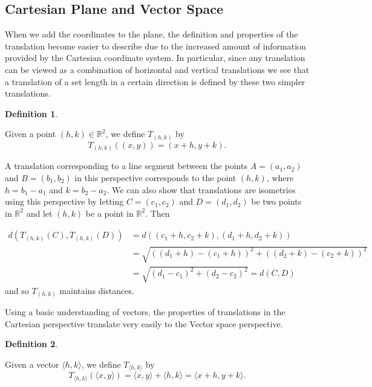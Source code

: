 \documentclass[
]{book}
\theoremstyle{definition}
\newtheorem{definition}{Definition}[chapter]
\theoremstyle{definition}
\theoremstyle{definition}
\theoremstyle{definition}
\theoremstyle{remark}
\begin{document}
\hypertarget{cartesian-plane-and-vector-space}{%
\subsection{Cartesian Plane and Vector Space}\label{cartesian-plane-and-vector-space}}

When we add the coordinates to the plane, the definition and properties of the translation become easier to describe due to the increased amount of information provided by the Cartesian coordinate system. In particular, since any translation can be viewed as a combination of horizontal and vertical translations we see that a translation of a set length in a certain direction is defined by these two simpler translations.

\begin{definition}
\protect\hypertarget{def:unlabeled-div-258}{}\label{def:unlabeled-div-258}

Given a point \((h,k)\in \mathbb{R}^2\), we define \(T_{(h,k)}\) by \[T_{(h,k)} \left( (x,y)\right) = (x+h,y+k).\]

\end{definition}

A translation corresponding to a line segment between the points \(A=(a_1,a_2)\) and \(B=(b_1,b_2)\) in this perspective corresponds to the point \((h,k)\), where \(h=b_1-a_1\) and \(k=b_2-a_2\). We can also show that translations are isometries using this perspective by letting \(C=(c_1,c_2)\) and \(D=(d_1,d_2)\) be two points in \(\mathbb{R}^2\) and let \((h,k)\) be a point in \(\mathbb{R}^2\). Then

\begin{align*}
    d\left( T_{(h,k)}(C), T_{(h,k)}(D)\right) & = d\left( (c_1+h,c_2+k), (d_1+h,d_2+k)\right) \\
     & = \sqrt{ \left( (d_1+h)-(c_1+h)\right)^2 + \left( (d_2+k)-(c_2+k)\right)^2 } \\
     & = \sqrt{ (d_1-c_1)^2 + (d_2-c_2)^2 } = d\left(C,D\right) 
\end{align*}
and so \(T_{(h,k)}\) maintains distances.

Using a basic understanding of vectors, the properties of translations in the Cartesian perspective translate very easily to the Vector space perspective.

\begin{definition}
\protect\hypertarget{def:unlabeled-div-259}{}\label{def:unlabeled-div-259}

Given a vector \(\langle h,k\rangle\), we define \(T_{\langle h,k \rangle}\) by \[T_{\langle h,k \rangle} \left( \langle x,y\rangle \right) = \langle x,y \rangle + \langle h,k \rangle = \langle x+h,y+k\rangle.\]

\end{definition}
\end{document}
